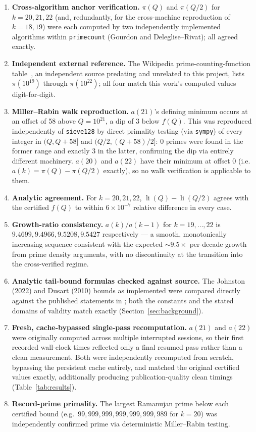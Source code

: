 \documentclass[11pt]{amsart}
\newcommand{\pcount}{\pi}
\newcommand{\li}{\operatorname{li}}
\begin{document}
\begin{enumerate}
  \item \textbf{Cross-algorithm anchor verification.} $\pcount(Q)$ and
  $\pcount(Q/2)$ for $k=20,21,22$ (and, redundantly, for the
  cross-machine reproduction of $k=18,19$) were each computed by two
  independently implemented algorithms within \texttt{primecount}
  (Gourdon and Deleglise--Rivat); all agreed exactly.
  \item \textbf{Independent external reference.} The Wikipedia
  prime-counting-function table~\cite{wikipedia-picount}, an
  independent source predating and unrelated to this project, lists
  $\pcount(10^{19})$ through $\pcount(10^{22})$; all four match this
  work's computed values digit-for-digit.
  \item \textbf{Miller--Rabin walk reproduction.} $a(21)$'s defining
  minimum occurs at an offset of 58 above $Q=10^{21}$, a dip of 3 below
  $f(Q)$. This was reproduced independently of \texttt{sieve128} by
  direct primality testing (via \texttt{sympy}) of every integer in
  $(Q, Q+58]$ and $(Q/2, (Q+58)/2]$: 0 primes were found in the former
  range and exactly 3 in the latter, confirming the dip via entirely
  different machinery. $a(20)$ and $a(22)$ have their minimum at offset
  0 (i.e.\ $a(k) = \pcount(Q)-\pcount(Q/2)$ exactly), so no walk
  verification is applicable to them.
  \item \textbf{Analytic agreement.} For $k=20,21,22$,
  $\li(Q)-\li(Q/2)$ agrees with the certified $f(Q)$ to within
  $6\times10^{-7}$ relative difference in every case.
  \item \textbf{Growth-ratio consistency.} $a(k)/a(k-1)$ for
  $k=19,\dots,22$ is $9.4699, 9.4966, 9.5208, 9.5427$ respectively ---
  a smooth, monotonically increasing sequence consistent with the
  expected $\sim\!9.5\times$ per-decade growth from prime density
  arguments, with no discontinuity at the transition into the
  cross-verified regime.
  \item \textbf{Analytic tail-bound formulas checked against source.}
  The Johnston (2022) and Dusart (2010) bounds as implemented were
  compared directly against the published statements in
  \cite{johnston2022,dusart2010}; both the constants and the stated
  domains of validity match exactly (Section~\ref{sec:background}).
  \item \textbf{Fresh, cache-bypassed single-pass recomputation.}
  $a(21)$ and $a(22)$ were originally computed across multiple
  interrupted sessions, so their first recorded wall-clock times
  reflected only a final resumed pass rather than a clean measurement.
  Both were independently recomputed from scratch, bypassing the
  persistent cache entirely, and matched the original certified values
  exactly, additionally producing publication-quality clean timings
  (Table~\ref{tab:results}).
  \item \textbf{Record-prime primality.} The largest Ramanujan prime
  below each certified bound (e.g.\ $99{,}999{,}999{,}999{,}999{,}999{,}989$
  for $k=20$) was independently confirmed prime via deterministic
  Miller--Rabin testing.
\end{enumerate}
\end{document}
